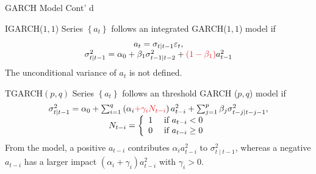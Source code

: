 \begin{frame}{GARCH Model Cont' d}
  \small{
  \begin{block}{IGARCH($1,1$) \cite{engle1986_igarch}}
    Series $\left\{a_{t}\right\}$ follows an integrated GARCH($1,1$) model if
    \begin{displaymath}
      \begin{array}{c} %
        a_{t}=\sigma_{t \mid t-1} \varepsilon_{t}, \\
        \sigma_{t \mid t-1}^{2}=\alpha_{0}+\beta_{1}\sigma_{t-1 \mid t-2}^2+\red{(1-\beta_{1})}a_{t-1}^{2}
      \end{array}
    \end{displaymath}
    The unconditional variance of $a_{t}$ is not defined.
  \end{block}
  
  \begin{block}{TGARCH$(p,q)$ \cite{zakoian1994_tgarch}}
    Series $\left\{a_{t}\right\}$ follows an threshold GARCH ($p,q$) model if
    \begin{displaymath}
      \begin{array}{c}
        \sigma_{t \mid t-1}^{2}=\alpha_{0}+\sum_{i=1}^{q}\left(\alpha_{i}\red{+\gamma_{i} N_{t-i}}\right) a_{t-i}^{2}+\sum_{j=1}^{p} \beta_{j} \sigma_{t-j \mid t-j-1}^{2},\\
        N_{t-i}=\left\{\begin{array}{ll}
          1 & \text { if } a_{t-i}<0 \\
          0 & \text { if } a_{t-i} \geq 0
          \end{array}\right.
      \end{array}
    \end{displaymath}
    From the model, a positive $a_{t-i}$ contributes $\alpha_{i}a_{t-i}^2$ to $\sigma_{t \mid t-1}^2$, whereas a negative $a_{t-i}$ has a larger impact $(\alpha_{i}+\gamma_{i})a_{t-i}^2$ with $\gamma_{i}>0$.
  \end{block}}
\end{frame}

